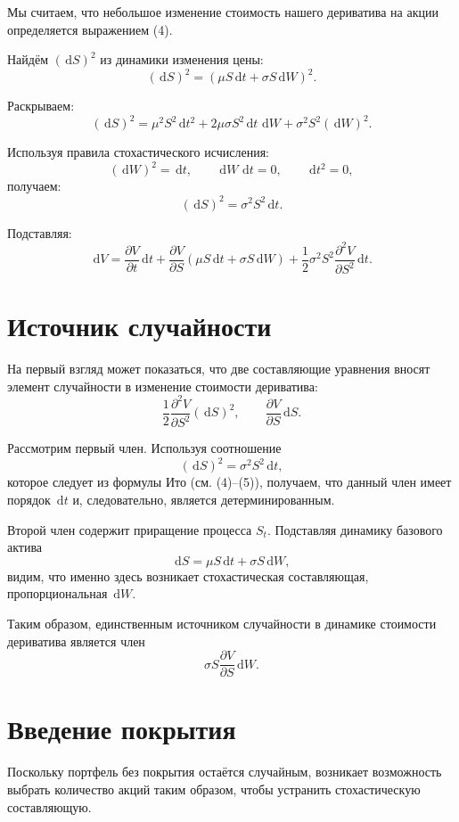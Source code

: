 \documentclass[12pt]{article}
\newcommand{\dd}{\,\mathrm{d}}
\newcommand{\pd}[2]{\frac{\partial #1}{\partial #2}}
\newcommand{\pdd}[2]{\frac{\partial^2 #1}{\partial #2^2}}
\begin{document}
Мы считаем, что небольшое изменение стоимость нашего дериватива на акции определяется выражением (4).

Найдём $(\dd S)^2$ из динамики изменения цены:
\[
(\dd S)^2 = (\mu S \dd t + \sigma S \dd W)^2.
\]

Раскрываем:
\[
(\dd S)^2 =
\mu^2 S^2 \dd t^2
+ 2\mu\sigma S^2 \dd t\,\dd W
+ \sigma^2 S^2 (\dd W)^2.
\]

Используя правила стохастического исчисления:
\[
(\dd W)^2=\dd t,\qquad
\dd W\,\dd t=0,\qquad
\dd t^2=0,
\]
получаем:
\begin{equation}
(\dd S)^2=\sigma^2 S^2 \dd t.
\end{equation}

Подставляя:
\begin{equation}
\dd V =
\pd{V}{t}\dd t
+ \pd{V}{S}(\mu S \dd t + \sigma S \dd W)
+ \frac{1}{2}\sigma^2 S^2 \pdd{V}{S}\dd t.
\end{equation}

\section{Источник случайности}

На первый взгляд может показаться, что две составляющие уравнения вносят
элемент случайности в изменение стоимости дериватива:
\[
\frac{1}{2}\frac{\partial^2 V}{\partial S^2}(\dd S)^2,
\qquad
\frac{\partial V}{\partial S}\dd S.
\]

Рассмотрим первый член. Используя соотношение
\[
(\dd S)^2=\sigma^2 S^2 \dd t,
\]
которое следует из формулы Ито (см. (4)–(5)), получаем, что данный член имеет
порядок $\dd t$ и, следовательно, является детерминированным.

Второй член содержит приращение процесса $S_t$. Подставляя динамику
базового актива
\[
\dd S = \mu S \dd t + \sigma S \dd W,
\]
видим, что именно здесь возникает стохастическая составляющая,
пропорциональная $\dd W$.

Таким образом, единственным источником случайности в динамике стоимости
дериватива является член
\[
\sigma S \frac{\partial V}{\partial S}\dd W.
\]

\section{Введение покрытия}

Поскольку портфель без покрытия остаётся случайным,
возникает возможность выбрать количество акций таким образом,
чтобы устранить стохастическую составляющую.
\end{document}
